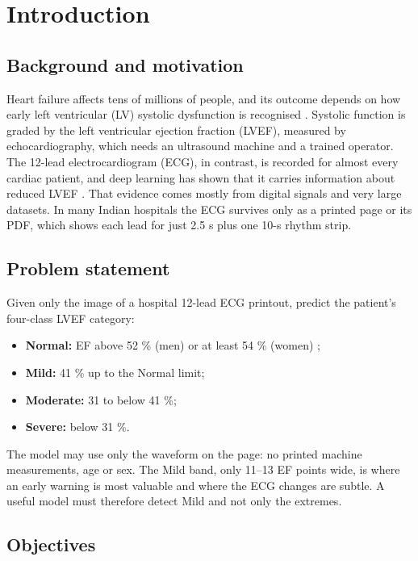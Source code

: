 \chapter{Introduction}\label{ch:1}

\section{Background and motivation}\label{sec:1.1}

Heart failure affects tens of millions of people, and its outcome depends on how early left ventricular (LV) systolic dysfunction is recognised \cite{ref1,ref2}. Systolic function is graded by the left ventricular ejection fraction (LVEF), measured by echocardiography, which needs an ultrasound machine and a trained operator. The 12-lead electrocardiogram (ECG), in contrast, is recorded for almost every cardiac patient, and deep learning has shown that it carries information about reduced LVEF \cite{ref3,ref4}. That evidence comes mostly from digital signals and very large datasets. In many Indian hospitals the ECG survives only as a printed page or its PDF, which shows each lead for just 2.5 s plus one 10-s rhythm strip.

\section{Problem statement}\label{sec:1.2}

Given only the image of a hospital 12-lead ECG printout, predict the patient's four-class LVEF category:

\begin{itemize}
  \item \textbf{Normal:} EF above 52 \% (men) or at least 54 \% (women) \cite{ref5};
  \item \textbf{Mild:} 41 \% up to the Normal limit;
  \item \textbf{Moderate:} 31 to below 41 \%;
  \item \textbf{Severe:} below 31 \%.
\end{itemize}
The model may use only the waveform on the page: no printed machine measurements, age or sex. The Mild band, only 11--13 EF points wide, is where an early warning is most valuable and where the ECG changes are subtle. A useful model must therefore detect Mild and not only the extremes.

\section{Objectives}\label{sec:1.3}

